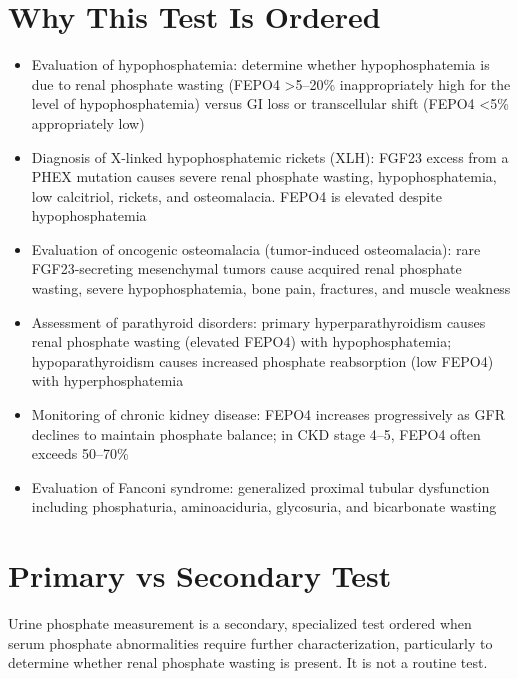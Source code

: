 \section*{Why This Test Is Ordered}
\begin{itemize}
  \item Evaluation of hypophosphatemia: determine whether hypophosphatemia is due to renal phosphate wasting (FEPO4 >5--20\% inappropriately high for the level of hypophosphatemia) versus GI loss or transcellular shift (FEPO4 <5\% appropriately low)
  \item Diagnosis of X-linked hypophosphatemic rickets (XLH): FGF23 excess from a PHEX mutation causes severe renal phosphate wasting, hypophosphatemia, low calcitriol, rickets, and osteomalacia. FEPO4 is elevated despite hypophosphatemia \cite{carpenter2011clinicians}
  \item Evaluation of oncogenic osteomalacia (tumor-induced osteomalacia): rare FGF23-secreting mesenchymal tumors cause acquired renal phosphate wasting, severe hypophosphatemia, bone pain, fractures, and muscle weakness \cite{chong2011tumor}
  \item Assessment of parathyroid disorders: primary hyperparathyroidism causes renal phosphate wasting (elevated FEPO4) with hypophosphatemia; hypoparathyroidism causes increased phosphate reabsorption (low FEPO4) with hyperphosphatemia
  \item Monitoring of chronic kidney disease: FEPO4 increases progressively as GFR declines to maintain phosphate balance; in CKD stage 4--5, FEPO4 often exceeds 50--70\%
  \item Evaluation of Fanconi syndrome: generalized proximal tubular dysfunction including phosphaturia, aminoaciduria, glycosuria, and bicarbonate wasting
\end{itemize}

\section*{Primary vs Secondary Test}
Urine phosphate measurement is a secondary, specialized test ordered when serum phosphate abnormalities require further characterization, particularly to determine whether renal phosphate wasting is present. It is not a routine test.


